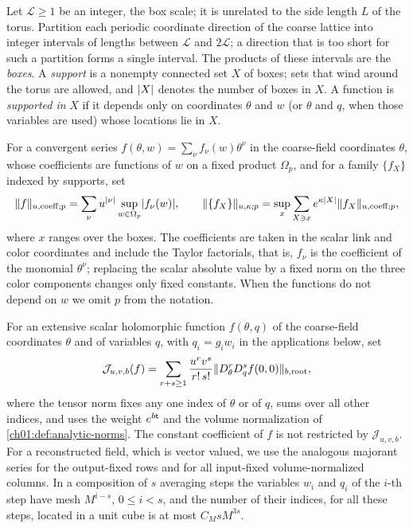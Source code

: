 \begin{definition}\label{ch09:def:supported-coefficient-norms}
Let $\mathscr L\ge1$ be an integer, the box scale; it is unrelated to the side length $L$ of the torus. Partition each periodic coordinate direction of the coarse lattice into integer intervals of lengths between $\mathscr L$ and $2\mathscr L$; a direction that is too short for such a partition forms a single interval. The products of these intervals are the \emph{boxes}. A \emph{support} is a nonempty connected set $X$ of boxes; sets that wind around the torus are allowed, and $\lvert X\rvert$ denotes the number of boxes in $X$. A function is \emph{supported in} $X$ if it depends only on coordinates $\theta$ and $w$ (or $\theta$ and $q$, when those variables are used) whose locations lie in $X$.

For a convergent series $f(\theta,w)=\sum_\nu f_\nu(w)\theta^\nu$ in the coarse-field coordinates $\theta$, whose coefficients are functions of $w$ on a fixed product $\Omega_p$, and for a family $\{f_X\}$ indexed by supports, set
\begin{equation}\label{ch09:eq:coefficient-norm}
 \lVert f\rVert_{u,\mathrm{coeff};p}=\sum_\nu u^{\lvert \nu\rvert}\sup_{w\in\Omega_p}\lvert f_\nu(w)\rvert,
 \qquad
 \lVert \{f_X\}\rVert_{u,\kappa;p}=\sup_x\sum_{X\ni x}e^{\kappa\lvert X\rvert}\lVert f_X\rVert_{u,\mathrm{coeff};p},
\end{equation}
where $x$ ranges over the boxes. The coefficients are taken in the scalar link and color coordinates and include the Taylor factorials, that is, $f_\nu$ is the coefficient of the monomial $\theta^\nu$; replacing the scalar absolute value by a fixed norm on the three color components changes only fixed constants. When the functions do not depend on $w$ we omit $p$ from the notation.

For an extensive scalar holomorphic function $f(\theta,q)$ of the coarse-field coordinates $\theta$ and of variables $q$, with $q_i=g_iw_i$ in the applications below, set
\begin{equation}\label{ch09:eq:joint-seminorm}
 \mathcal J_{u,v,b}(f)=\sum_{r+s\ge1}\frac{u^rv^s}{r!\,s!}\lVert D_\theta^rD_q^sf(0,0)\rVert_{b,\mathrm{root}},
\end{equation}
where the tensor norm fixes any one index of $\theta$ or of $q$, sums over all other indices, and uses the weight $e^{b\mathsf t}$ and the volume normalization of \cref{ch01:def:analytic-norms}. The constant coefficient of $f$ is not restricted by $\mathcal J_{u,v,b}$. For a reconstructed field, which is vector valued, we use the analogous majorant series for the output-fixed rows and for all input-fixed volume-normalized columns. In a composition of $s$ averaging steps the variables $w_i$ and $q_i$ of the $i$-th step have mesh $M^{i-s}$, $0\le i<s$, and the number of their indices, for all these steps, located in a unit cube is at most $C_MsM^{3s}$.
\end{definition}

